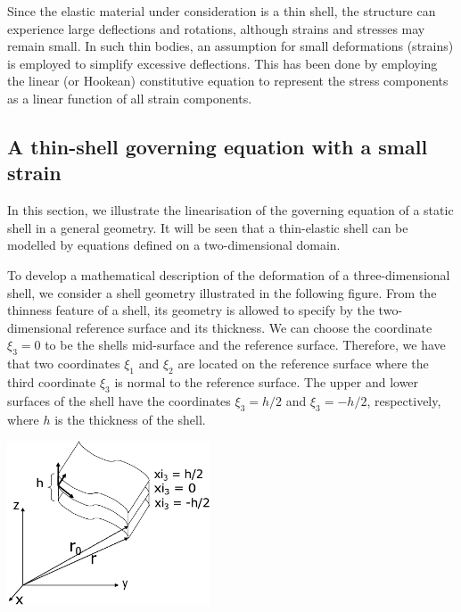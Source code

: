 Since the elastic material under consideration is a thin shell, the structure can experience large deflections and rotations, although strains and stresses may remain small. In such thin bodies, an assumption for small deformations (strains) is employed to simplify excessive deflections. This has been done by employing the linear (or Hookean) constitutive equation to represent the stress components as a linear function of all strain components.



\hypertarget{index_theory}{}\subsection{A thin-\/shell governing equation with a small strain}\label{index_theory}
In this section, we illustrate the linearisation of the governing equation of a static shell in a general geometry. It will be seen that a thin-\/elastic shell can be modelled by equations defined on a two-\/dimensional domain.

To develop a mathematical description of the deformation of a three-\/dimensional shell, we consider a shell geometry illustrated in the following figure. From the thinness feature of a shell, its geometry is allowed to specify by the two-\/dimensional reference surface and its thickness. We can choose the coordinate $ \xi_3 = 0 $ to be the shell\textquotesingle{}s mid-\/surface and the reference surface. Therefore, we have that two coordinates $ \xi_1 $ and $ \xi_2 $ are located on the reference surface where the third coordinate $ \xi_3 $ is normal to the reference surface. The upper and lower surfaces of the shell have the coordinates $ \xi_3 = h/2 $ and $ \xi_3 = -h/2 $, respectively, where $ h $ is the thickness of the shell.

 
\begin{DoxyImage}
\includegraphics[width=0.45\textwidth]{shell_geometry}
\end{DoxyImage}


